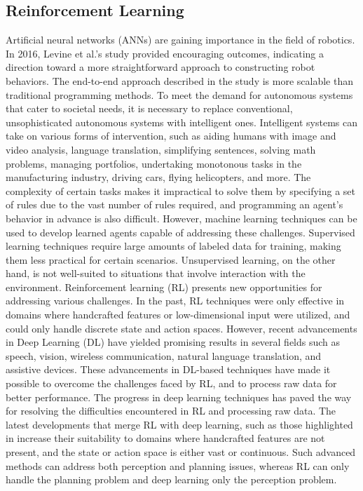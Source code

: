 \documentclass[12pt,oneside]{article}
\begin{document}
\subsection{Reinforcement Learning}
Artificial neural networks (ANNs) are gaining importance in the field of robotics. In 2016, Levine et al.'s study \cite{24_ball2017comprehensive} provided encouraging outcomes, indicating a direction toward a more straightforward approach to constructing robot behaviors. The end-to-end approach described in the study is more scalable than traditional programming methods. To meet the demand for autonomous systems that cater to societal needs, it is necessary to replace conventional, unsophisticated autonomous systems with intelligent ones. Intelligent systems can take on various forms of intervention, such as aiding humans with image and video analysis, language translation, simplifying sentences, solving math problems, managing portfolios, undertaking monotonous tasks in the manufacturing industry, driving cars, flying helicopters, and more. 
The complexity of certain tasks makes it impractical to solve them by specifying a set of rules due to the vast number of rules required, and programming an agent's behavior in advance is also difficult. However, machine learning techniques can be used to develop learned agents capable of addressing these challenges. Supervised learning techniques require large amounts of labeled data for training, making them less practical for certain scenarios. Unsupervised learning, on the other hand, is not well-suited to situations that involve interaction with the environment.
Reinforcement learning (RL) \cite{24_ball2017comprehensive} presents new opportunities for addressing various challenges. In the past, RL techniques were only effective in domains where handcrafted features or low-dimensional input were utilized, and could only handle discrete state and action spaces. However, recent advancements in Deep Learning (DL) have yielded promising results in several fields such as speech, vision, wireless communication, natural language translation, and assistive devices. These advancements in DL-based techniques have made it possible to overcome the challenges faced by RL, and to process raw data for better performance.
The progress in deep learning techniques has paved the way for resolving the difficulties encountered in RL and processing raw data. The latest developments that merge RL with deep learning, such as those highlighted in  \cite{27_mnih2016asynchronous} increase their suitability to domains where handcrafted features are not present, and the state or action space is either vast or continuous. Such advanced methods can address both perception and planning issues, whereas RL can only handle the planning problem and deep learning only the perception problem.
\end{document}

